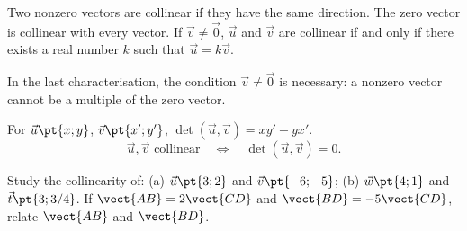 \begin{keypoint}[Definition]
Two nonzero vectors are collinear if they have the same direction. The zero vector is collinear with every vector. If $\vec v\ne\vec0$, $\vec u$ and $\vec v$ are collinear if and only if there exists a real number $k$ such that $\vec u=k\vec v$.
\end{keypoint}
\begin{pitfall}In the last characterisation, the condition $\vec v\ne\vec0$ is necessary: a nonzero vector cannot be a multiple of the zero vector.\end{pitfall}
\begin{keypoint}
For $\vec u\pt{x;y}$, $\vec v\pt{x';y'}$, $\det(\vec u,\vec v)=xy'-yx'$.
\[\vec u,\vec v\text{ collinear}\quad\Longleftrightarrow\quad\det(\vec u,\vec v)=0.\]
\end{keypoint}
\begin{example}Study the collinearity of: (a) $\vec u\pt{3;2}$ and $\vec v\pt{-6;-5}$; (b) $\vec w\pt{4;1}$ and $\vec t\pt{3;3/4}$. If $\vect{AB}=2\vect{CD}$ and $\vect{BD}=-5\vect{CD}$, relate $\vect{AB}$ and $\vect{BD}$.\end{example}

